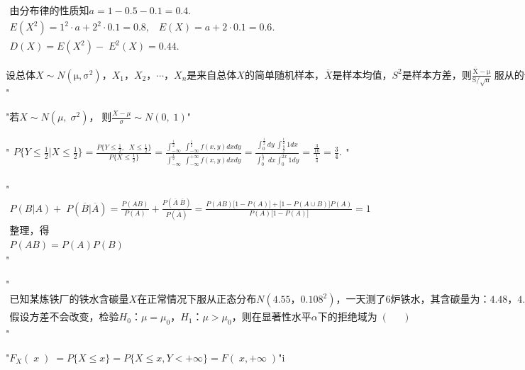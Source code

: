 
$\begin{array}{l}\mathrm{由分布律的性质知}a=1-0.5-0.1=0.4.\\E(X^2)=1^2\cdot a+2^2\cdot0.1=0.8,\;\;\;E(X)=a+2\cdot0.1=0.6.\\D(X)=E(X^2)-\;E^2(X)=0.44.\end{array}$


$\mathrm{设总体}X\sim N\left(\mathrm\mu,\mathrm\sigma^2\right)，X_1，X_2，\cdots，X_n\mathrm{是来自总体}X\mathrm{的简单随机样本}，\overline X\mathrm{是样本均值}，S^2\mathrm{是样本方差}，\mathrm 则\frac{\overline{\mathrm X}-\mathrm\mu}{\mathrm S/\sqrt{\mathrm n}}\;\mathrm{服从的分布为}\;\left(\;\;\;\;\right)$"


"$若X\sim N(\mu,\;\sigma^2)，\;则\frac{X-\mu}\sigma\sim N(0,\;1)$"


"$\begin{array}{l}P\{Y\leq\frac12\vert X\leq\frac12\}=\frac{P\{Y\leq\frac12,\;\;X\leq\frac12\}}{P\{X\leq\frac12\}}=\frac{\int_{-\infty}^{\displaystyle\frac12}\;\int_{-\infty}^\frac12f(x,y)dxdy}{\int_{-\infty}^\frac12\;\int_{-\infty}^{+\infty}f(x,y)dxdy}=\frac{\int_0^{\displaystyle\frac12}dy\;\int_
{\displaystyle\frac y2}^\frac121dx}{\int_0^\frac12\;dx\int_0^{2x}1dy}=\frac{\displaystyle\frac3{16}}{\displaystyle\frac14}=\frac34.\\\end{array}$"


"$\begin{array}{l}P(B\vert A)+\;P(\overline B\vert\overline A)=\frac{P(AB)}{P(A)}+\frac{P(\overline A\;\overline B)}{P(\overline A)}=\frac{P(AB)\lbrack1-P(A)\rbrack+\lbrack1-P(A\cup B)\rbrack P(A)}{P(A)\lbrack1-P(A)\rbrack}=1\\\mathrm{整理}，得\\P(AB)=P(A)P(B)\end{array}$"


"$\begin{array}{l}\mathrm{已知某炼铁厂的铁水含碳量}X\mathrm{在正常情况下服从正态分布}N\left(4.55，0.108^2\right)，\mathrm{一天测了}6\mathrm{炉铁水}，\mathrm{其含碳量为}：4.48，4.40，4.46，4.50，4.44，4.43，\\\mathrm{假设方差不会改变}，\mathrm{检验}H_0：\mu=\mu_0，H_1：\mu>\mu_0，\mathrm{则在显著性水平}\alpha\mathrm{下的拒绝域为}\;\left(\;\;\;\;\;\right)\end{array}$"


"$F_X(\;x\;)\;=P\{X\leq x\}=P\{X\leq x,Y<+\infty\}=F(\;x,+\infty\;)$"i


